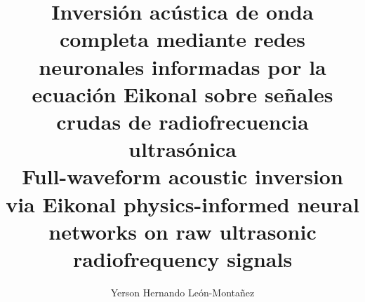 \documentclass[9pt]{article}
\begin{document}
\\[0.25cm]

\title{{\fontsize{13.5}{15.5}\selectfont Inversión acústica de onda completa mediante redes neuronales informadas por la ecuación Eikonal sobre señales crudas de radiofrecuencia ultrasónica}\\[0.25cm]
{\fontsize{11.5}{13.5}\selectfont\color{raccefyngray} Full-waveform acoustic inversion via Eikonal physics-informed neural networks on raw ultrasonic radiofrequency signals}\\[0.55cm]}

\author[1,*]{Yerson Hernando León-Montañez }

\date{}
\maketitle
\end{document}
